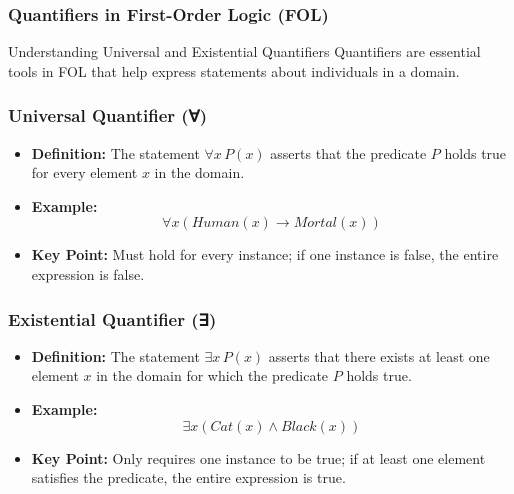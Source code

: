\documentclass[aspectratio=169]{beamer}
\begin{document}
\begin{frame}[fragile]
    \frametitle{Quantifiers in First-Order Logic (FOL)}
    \begin{block}{Understanding Universal and Existential Quantifiers}
        Quantifiers are essential tools in FOL that help express statements about individuals in a domain.
    \end{block}
\end{frame}

\begin{frame}[fragile]
    \frametitle{Universal Quantifier (∀)}
    \begin{itemize}
        \item \textbf{Definition:} The statement $\forall x \, P(x)$ asserts that the predicate \( P \) holds true for every element \( x \) in the domain.
        
        \item \textbf{Example:} 
        \begin{equation}
            \forall x (Human(x) \rightarrow Mortal(x))
        \end{equation}
        
        \item \textbf{Key Point:} Must hold for every instance; if one instance is false, the entire expression is false.
    \end{itemize}
\end{frame}

\begin{frame}[fragile]
    \frametitle{Existential Quantifier (∃)}
    \begin{itemize}
        \item \textbf{Definition:} The statement $\exists x \, P(x)$ asserts that there exists at least one element \( x \) in the domain for which the predicate \( P \) holds true.
        
        \item \textbf{Example:}
        \begin{equation}
            \exists x (Cat(x) \land Black(x))
        \end{equation}
        
        \item \textbf{Key Point:} Only requires one instance to be true; if at least one element satisfies the predicate, the entire expression is true.
    \end{itemize}
\end{frame}
\end{document}
